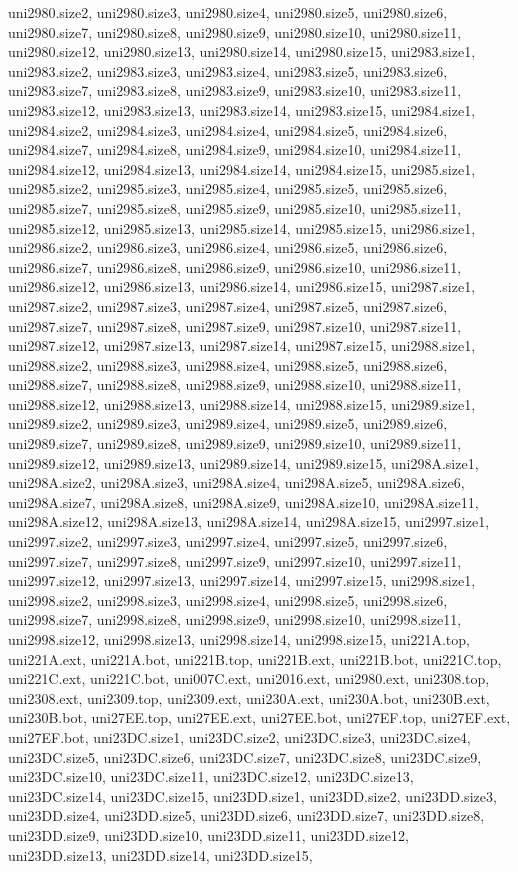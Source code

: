uni2980.size2, uni2980.size3, uni2980.size4, uni2980.size5, uni2980.size6, uni2980.size7, uni2980.size8, uni2980.size9, uni2980.size10, uni2980.size11, uni2980.size12, uni2980.size13, uni2980.size14, uni2980.size15, uni2983.size1, uni2983.size2, uni2983.size3, uni2983.size4, uni2983.size5, uni2983.size6, uni2983.size7, uni2983.size8, uni2983.size9, uni2983.size10, uni2983.size11, uni2983.size12, uni2983.size13, uni2983.size14, uni2983.size15, uni2984.size1, uni2984.size2, uni2984.size3, uni2984.size4, uni2984.size5, uni2984.size6, uni2984.size7, uni2984.size8, uni2984.size9, uni2984.size10, uni2984.size11, uni2984.size12, uni2984.size13, uni2984.size14, uni2984.size15, uni2985.size1, uni2985.size2, uni2985.size3, uni2985.size4, uni2985.size5, uni2985.size6, uni2985.size7, uni2985.size8, uni2985.size9, uni2985.size10, uni2985.size11, uni2985.size12, uni2985.size13, uni2985.size14, uni2985.size15, uni2986.size1, uni2986.size2, uni2986.size3, uni2986.size4, uni2986.size5, uni2986.size6, uni2986.size7, uni2986.size8, uni2986.size9, uni2986.size10, uni2986.size11, uni2986.size12, uni2986.size13, uni2986.size14, uni2986.size15, uni2987.size1, uni2987.size2, uni2987.size3, uni2987.size4, uni2987.size5, uni2987.size6, uni2987.size7, uni2987.size8, uni2987.size9, uni2987.size10, uni2987.size11, uni2987.size12, uni2987.size13, uni2987.size14, uni2987.size15, uni2988.size1, uni2988.size2, uni2988.size3, uni2988.size4, uni2988.size5, uni2988.size6, uni2988.size7, uni2988.size8, uni2988.size9, uni2988.size10, uni2988.size11, uni2988.size12, uni2988.size13, uni2988.size14, uni2988.size15, uni2989.size1, uni2989.size2, uni2989.size3, uni2989.size4, uni2989.size5, uni2989.size6, uni2989.size7, uni2989.size8, uni2989.size9, uni2989.size10, uni2989.size11, uni2989.size12, uni2989.size13, uni2989.size14, uni2989.size15, uni298A.size1, uni298A.size2, uni298A.size3, uni298A.size4, uni298A.size5, uni298A.size6, uni298A.size7, uni298A.size8, uni298A.size9, uni298A.size10, uni298A.size11, uni298A.size12, uni298A.size13, uni298A.size14, uni298A.size15, uni2997.size1, uni2997.size2, uni2997.size3, uni2997.size4, uni2997.size5, uni2997.size6, uni2997.size7, uni2997.size8, uni2997.size9, uni2997.size10, uni2997.size11, uni2997.size12, uni2997.size13, uni2997.size14, uni2997.size15, uni2998.size1, uni2998.size2, uni2998.size3, uni2998.size4, uni2998.size5, uni2998.size6, uni2998.size7, uni2998.size8, uni2998.size9, uni2998.size10, uni2998.size11, uni2998.size12, uni2998.size13, uni2998.size14, uni2998.size15, uni221A.top, uni221A.ext, uni221A.bot, uni221B.top, uni221B.ext, uni221B.bot, uni221C.top, uni221C.ext, uni221C.bot, uni007C.ext, uni2016.ext, uni2980.ext, uni2308.top, uni2308.ext, uni2309.top, uni2309.ext, uni230A.ext, uni230A.bot, uni230B.ext, uni230B.bot, uni27EE.top, uni27EE.ext, uni27EE.bot, uni27EF.top, uni27EF.ext, uni27EF.bot, uni23DC.size1, uni23DC.size2, uni23DC.size3, uni23DC.size4, uni23DC.size5, uni23DC.size6, uni23DC.size7, uni23DC.size8, uni23DC.size9, uni23DC.size10, uni23DC.size11, uni23DC.size12, uni23DC.size13, uni23DC.size14, uni23DC.size15, uni23DD.size1, uni23DD.size2, uni23DD.size3, uni23DD.size4, uni23DD.size5, uni23DD.size6, uni23DD.size7, uni23DD.size8, uni23DD.size9, uni23DD.size10, uni23DD.size11, uni23DD.size12, uni23DD.size13, uni23DD.size14, uni23DD.size15, 